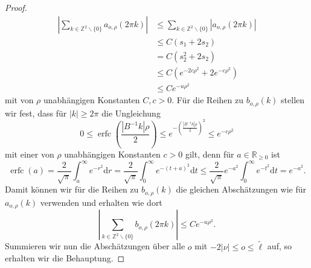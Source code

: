\documentclass[12pt,a4paper]{scrartcl}
\newcommand{\dd}{\mathrm{d}}
\numberwithin{equation}{section}
\newcommand{\R}{\mathbb{R}} %
\newcommand{\Z}{\mathbb{Z}} %
\newcommand{\erfc}{\operatorname{erfc}}
\begin{document}
\begin{proof}
\begin{align*}
\left|\sum_{k \in \Z^2 \backslash \{0\} }a_{o,\rho}(2 \pi k)\right| &\leq 
\sum_{k \in \Z^2 \backslash \{0\} }|a_{o,\rho}(2 \pi k)| \\
&\leq C (s_1 + 2s_2) \\
& =C (s_2^2+2s_2) \\
& \leq  C \left(e^{- 2c \rho^2} + 2e^{- c \rho^2} \right) \\
& \leq C e^{-u \rho^2}
\end{align*}
mit von $\rho$ unabhängigen Konstanten $C,c>0$. Für die Reihen zu $b_{o,\rho}(k)$ stellen wir fest, dass für $|k| \geq 2\pi$ die Ungleichung
\[
0 \leq \erfc \left( \frac{|B^{-1}k| \rho}{2} \right) \leq  e^{-\left( \frac{|B^{-1}k| \rho}{2} \right)^2} \leq e^{- c \rho^2}
\]
mit einer von $\rho$ unabhängigen Konstanten $c>0$ gilt, denn für $a \in \R_{\geq 0}$ ist
\[
\erfc(a)= \frac{2}{\sqrt{\pi}}\int_a^\infty e^{-r^2} \dd r = \frac{2}{\sqrt{\pi}}\int_0^\infty e^{-(t+a)^2} \dd t \leq \frac{2}{\sqrt{\pi}}e^{-a^2} \int_0^\infty e^{-t^2} \dd t = e^{-a^2}.
\] Damit können wir für die Reihen zu $b_{o,\rho}(k)$ die gleichen Abschätzungen wie für $a_{o,\rho}(k)$ verwenden und erhalten wie dort
\[
\left|\sum_{k \in \Z^2 \backslash \{0\} }b_{o,\rho}(2 \pi k)\right| \leq C e^{-u \rho^2}.
\]
Summieren wir nun die Abschätzungen über alle $o$ mit $-2|\nu| \leq o \leq \tilde \ell$ auf, so erhalten wir die Behauptung.
\end{proof}
\end{document}
